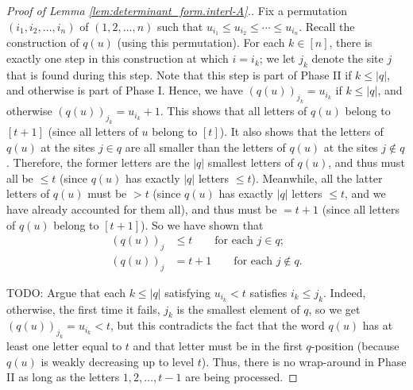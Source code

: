 \documentclass[reqno]{amsart}
\newcommand{\0}{\phantom{c}}
\theoremstyle{plain}
\theoremstyle{definition}
\numberwithin{equation}{section}
\begin{document}
\begin{proof}
[Proof of Lemma \ref{lem:determinant_form.interl-A}.] Fix a permutation
$\left(  i_{1},i_{2},\ldots,i_{n}\right)  $ of $\left(  1,2,\ldots,n\right)  $
such that $u_{i_{1}}\leq u_{i_{2}}\leq\cdots\leq u_{i_{n}}$. Recall the
construction of $q\left(  u\right)  $ (using this permutation). For each
$k\in\left[  n\right]  $, there is exactly one step in this construction at
which $i=i_{k}$; we let $j_{k}$ denote the site $j$ that is found during this
step. Note that this step is part of Phase II if $k\leq\left\vert q\right\vert
$, and otherwise is part of Phase I. Hence, we have $\left(  q\left(
u\right)  \right)  _{j_{k}}=u_{i_{k}}$ if $k\leq\left\vert q\right\vert $, and
otherwise $\left(  q\left(  u\right)  \right)  _{j_{k}}=u_{i_{k}}+1$. This
shows that all letters of $q\left(  u\right)  $ belong to $\left[  t+1\right]
$ (since all letters of $u$ belong to $\left[  t\right]  $). It also shows
that the letters of $q\left(  u\right)  $ at the sites $j\in q$ are all
smaller than the letters of $q\left(  u\right)  $ at the sites $j\notin q$.
Therefore, the former letters are the $\left\vert q\right\vert $ smallest
letters of $q\left(  u\right)  $, and thus must all be $\leq t$ (since
$q\left(  u\right)  $ has exactly $\left\vert q\right\vert $ letters $\leq
t$). Meanwhile, all the latter letters of $q\left(  u\right)  $ must be $>t$
(since $q\left(  u\right)  $ has exactly $\left\vert q\right\vert $ letters
$\leq t$, and we have already accounted for them all), and thus must be $=t+1$
(since all letters of $q\left(  u\right)  $ belong to $\left[  t+1\right]  $).
So we have shown that%
\begin{align*}
\left(  q\left(  u\right)  \right)  _{j}  & \leq t\qquad\text{for each }j\in
q;\\
\left(  q\left(  u\right)  \right)  _{j}  & =t+1\qquad\text{for each }j\notin
q.
\end{align*}


TODO: Argue that each $k\leq\left\vert q\right\vert $ satisfying $u_{i_{k}}<t$
satisfies $i_{k}\leq j_{k}$. Indeed, otherwise, the first time it fails,
$j_{k}$ is the smallest element of $q$, so we get $\left(  q\left(  u\right)
\right)  _{j_{k}}=u_{i_{k}}<t$, but this contradicts the fact that the word
$q\left(  u\right)  $ has at least one letter equal to $t$ and that letter
must be in the first $q$-position (because $q\left(  u\right)  $ is weakly
decreasing up to level $t$). Thus, there is no wrap-around in Phase II as long
as the letters $1,2,\ldots,t-1$ are being processed.


\end{proof}
\end{document}
